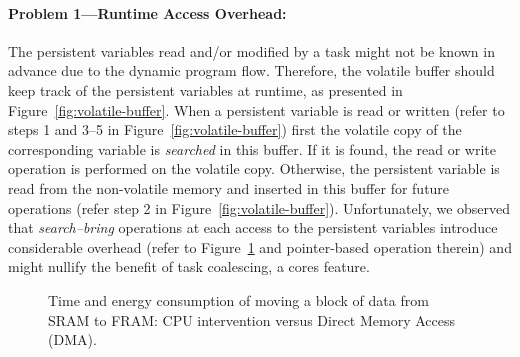 \paragraph{Problem 1---Runtime Access Overhead:} The persistent variables read and/or modified by a task might not be known in advance due to the dynamic program flow. Therefore, the volatile buffer should keep track of the persistent variables at runtime, as presented in Figure~\ref{fig:volatile-buffer}. When a persistent variable is read or written (refer to steps 1 and 3--5 in Figure~\ref{fig:volatile-buffer}) first the volatile copy of the corresponding variable is \emph{searched} in this buffer. If it is found, the read or write operation is performed on the volatile copy. Otherwise, the persistent variable is read from the non-volatile memory and inserted in this buffer for future operations (refer step 2 in Figure~\ref{fig:volatile-buffer}). Unfortunately, we observed that \emph{search--bring} operations at each access to the persistent variables introduce considerable overhead (refer to Figure~\ref{fig:dmaTimeEnergy} and pointer-based operation therein) and might nullify the benefit of task coalescing, a cores \sys feature.

\begin{figure}[t]
	\centering
	\caption{Time and energy consumption of moving a block of data from SRAM to FRAM: CPU intervention versus Direct Memory Access (DMA).}
	\label{fig:dmaTimeEnergy}
\end{figure}


